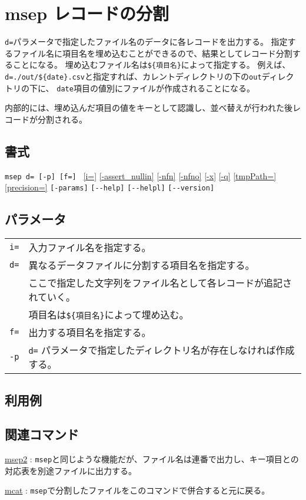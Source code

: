 
%

\section{msep レコードの分割\label{sect:msep}}
\verb|d=|パラメータで指定したファイル名のデータに各レコードを出力する。
指定するファイル名に項目名を埋め込むことができるので、結果としてレコード分割することになる。
埋め込むファイル名は\verb|${項目名}|によって指定する。
例えば、\verb|d=./out/${date}.csv|と指定すれば、カレントディレクトリの下の\verb|out|ディレクトリの下に、
\verb|date|項目の値別にファイルが作成されることになる。

内部的には、埋め込んだ項目の値をキーとして認識し、並べ替えが行われた後レコードが分割される。

\subsection*{書式}
\verb|msep d= [-p] [f=] |  
\hyperref[sect:option_i]{[i=]}
\hyperref[sect:option_assert_nullin]{[-assert\_nullin]}
\hyperref[sect:option_nfn]{[-nfn]} 
\hyperref[sect:option_nfno]{[-nfno]}  
\hyperref[sect:option_x]{[-x]}
\hyperref[sect:option_q]{[-q]}
\hyperref[sect:option_option_tmppath]{[tmpPath=]}
\hyperref[sect:option_precision]{[precision=]}
\verb|[-params]|
\verb|[--help]|
\verb|[--helpl]|
\verb|[--version]|\\

\subsection*{パラメータ}
\begin{table}[htbp]
{\small
\begin{tabular}{ll}
\verb|i=|    & 入力ファイル名を指定する。\\
\verb|d=|    & 異なるデータファイルに分割する項目名を指定する。\\
             & ここで指定した文字列をファイル名として各レコードが追記されていく。\\
             & 項目名は\verb|${項目名}|によって埋め込む。\\
\verb|f=|		 & 出力する項目名を指定する。 \\
\verb|-p|    & \verb|d=| パラメータで指定したディレクトリ名が存在しなければ作成する。\\
\end{tabular} 
}
\end{table} 


\subsection*{利用例}


\subsection*{関連コマンド}
\hyperref[sect:msep2]{msep2} : \verb|msep|と同じような機能だが、ファイル名は連番で出力し、キー項目との対応表を別途ファイルに出力する。

\hyperref[sect:mcat] {mcat} : \verb|msep|で分割したファイルをこのコマンドで併合すると元に戻る。

%
